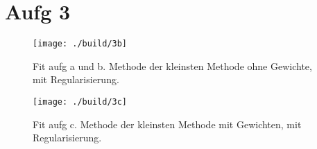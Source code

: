 \section*{Aufg 3}

\begin{figure}
\centering
\texttt{[image: ./build/3b]}
\caption{Fit aufg a und b. Methode der kleinsten Methode ohne Gewichte, mit Regularisierung.}
\label{fig:3b}
\end{figure}


\begin{figure}
\centering
\texttt{[image: ./build/3c]}
\caption{Fit aufg c. Methode der kleinsten Methode mit Gewichten, mit Regularisierung.}
\label{fig:3c}
\end{figure}